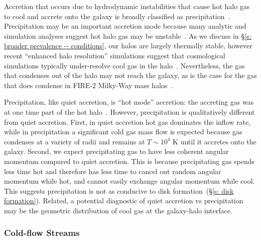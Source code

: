 \documentclass[fleqn,usenatbib]{mnras}
\begin{document}
Accretion that occurs due to hydrodynamic instabilities that cause hot halo gas to cool and accrete onto the galaxy is broadly classified as precipitation~\citep[e.g.][]{Sharma2012, Voit2015a, Voit2018, Voit2021}.
Precipitation may be an important accretion mode because many analytic and simulation analyses suggest hot halo gas may be unstable~\citep[e.g.][]{Balbus1989, Maller2004, McCourt2012, McCourt2016, Joung2012a, Li2014, Armillotta2016, McNamara2016, Schneider2018, Liang2018a, Gronke2019, Gronke2019a, Li2019, Fielding2020}.
As we discuss in \S\ref{s: broader prevalence -- conditions}, our halos are largely thermally stable, however recent ``enhanced halo resolution'' simulations suggest that cosmological simulations typically under-resolve cool gas in the halo~\citep{VandeVoort2018, Peeples2019a, Hummels2019, Suresh2019}.
Nevertheless, the gas that condenses out of the halo may not reach the galaxy, as is the case for the gas that does condense in FIRE-2 Milky-Way mass halos~\citep{Esmerian2020}.

Precipitation, like quiet accretion, is ``hot mode'' accretion: the accreting gas was at one time part of the hot halo~\citep[e.g.][]{Nelson2013}.
However, precipitation is qualitatively different from quiet accretion.
First, in quiet accretion hot gas dominates the inflow rate, while in precipitation a significant cold gas mass flow is expected because gas condenses at a variety of radii and remains at $T\sim 10^4$ K until it accretes onto the galaxy.
Second, we expect precipitating gas to have less coherent angular momentum compared to quiet accretion.
This is because precipitating gas spends less time hot and therefore has less time to cancel out random angular momentum while hot, and cannot easily exchange angular momentum while cool.
This suggests precipitation is not as conducive to disk formation~(\S\ref{s: disk formation}).
Related, a potential diagnostic of quiet accretion vs precipitation may be the geometric distribution of cool gas at the galaxy-halo interface.

\subsubsection{Cold-flow Streams}
\label{s: modes -- cold}
\end{document}
